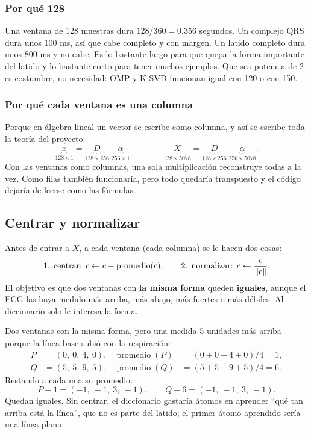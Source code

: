 \documentclass[11pt,letterpaper]{article}
\begin{document}
\subsubsection*{Por qué 128}

Una ventana de 128 muestras dura $128 / 360 = 0.356$ segundos. Un
complejo QRS dura unos 100 ms, así que cabe completo y con margen. Un
latido completo dura unos 800 ms y no cabe. Es lo bastante largo para
que quepa la forma importante del latido y lo bastante corto para tener
muchos ejemplos. Que sea potencia de 2 es costumbre, no necesidad: OMP
y K-SVD funcionan igual con 120 o con 150.

\subsubsection*{Por qué cada ventana es una columna}

Porque en álgebra lineal un vector se escribe como columna, y así se
escribe toda la teoría del proyecto:
\[
    \underbrace{x}_{128 \times 1}
    = \underbrace{D}_{128 \times 256}\;
      \underbrace{\alpha}_{256 \times 1}
    \qquad\qquad
    \underbrace{X}_{128 \times 5078}
    = \underbrace{D}_{128 \times 256}\;
      \underbrace{\alpha}_{256 \times 5078} .
\]
Con las ventanas como columnas, una sola multiplicación reconstruye
todas a la vez. Como filas también funcionaría, pero todo quedaría
transpuesto y el código dejaría de leerse como las fórmulas.

\subsection*{Centrar y normalizar}

Antes de entrar a $X$, a cada ventana (cada columna) se le hacen dos
cosas:
\[
    \text{1. centrar: } c \leftarrow c - \operatorname{promedio}(c),
    \qquad
    \text{2. normalizar: } c \leftarrow \frac{c}{\left\lVert c \right\rVert} .
\]
El objetivo es que dos ventanas con \textbf{la misma forma} queden
\textbf{iguales}, aunque el ECG las haya medido más arriba, más abajo,
más fuertes o más débiles. Al diccionario solo le interesa la forma.

\begin{ejemplo}
    Dos ventanas con la misma forma, pero una medida 5 unidades más
    arriba porque la línea base subió con la respiración:
    \begin{align*}
        P &= (0,\ 0,\ 4,\ 0), & \operatorname{promedio}(P)
            &= (0 + 0 + 4 + 0)/4 = 1, \\
        Q &= (5,\ 5,\ 9,\ 5), & \operatorname{promedio}(Q)
            &= (5 + 5 + 9 + 5)/4 = 6 .
    \end{align*}
    Restando a cada una su promedio:
    \[
        P - 1 = (-1,\ -1,\ 3,\ -1), \qquad
        Q - 6 = (-1,\ -1,\ 3,\ -1) .
    \]
    Quedan iguales. Sin centrar, el diccionario gastaría átomos en
    aprender ``qué tan arriba está la línea'', que no es parte del
    latido; el primer átomo aprendido sería una línea plana.
\end{ejemplo}
\end{document}
